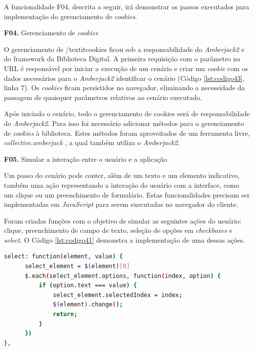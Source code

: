 A funcionalidade F04, descrita a seguir, irá demonstrar os passos executados para implementação do gerenciamento de \textit{cookies}.


\textbf{F04.} Gerenciamento de \textit{cookies}

O gerenciamento de /textit{cookies} ficou sob a responsabilidade do \textit{Amberjack2} e do framework da Biblioteca Digital. A primeira requisição com o parâmetro na URL é responsável por iniciar a execução de um cenário e criar um \textit{cookie} com os dados necessários para o \textit{Amberjack2} identificar o cenário (Código \ref{lst:codigo43}, linha 7). Os \textit{cookies} ficam persistidos no navegador, eliminando a necessidade da passagem de quaisquer parâmetros relativos ao cenário executado.

Após iniciado o cenário, todo o gerenciamento de cookies será de responsabilidade do \textit{Amberjack2}. Para isso foi necessário adicionar métodos para o gerenciamento de \textit{cookies} à biblioteca. Estes métodos foram aproveitados de um ferramenta livre, \textit{collective.amberjack} \cite{REDTURTLE}, a qual também utiliza o \textit{Amberjack2}.

\textbf{F05.} Simular a interação entre o usuário e a aplicação

Um passo do cenário pode conter, além de um texto e um elemento indicativo, também uma ação representando a interação do usuário com a interface, como um clique ou um preenchimento de formulário. Estas funcionalidades precisam ser implementadas em \textit{JavaScript} para serem executadas no navegador do cliente.

Foram criadas funções com o objetivo de simular as seguintes ações do usuário: clique, preenchimento de campo de texto, seleção de opções em \textit{checkboxes} e \textit{select}. O Código \ref{lst:codigo41} demonstra a implementação de uma dessas ações.

{\singlespace
\begin{lstlisting}[caption=Função para seleção de item em um \textit{select},language=bash,label={lst:codigo41}]
select: function(element, value) {
      select_element = $(element)[0]
      $.each(select_element.options, function(index, option) {
          if (option.text === value) {
              select_element.selectedIndex = index;
              $(element).change();
              return;
          }
      })
},
\end{lstlisting}
}

